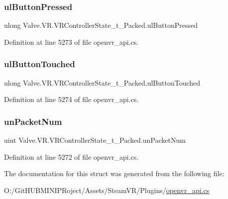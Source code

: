 \subsubsection{\texorpdfstring{ulButtonPressed}{ulButtonPressed}}
{\footnotesize\ttfamily ulong Valve.\+V\+R.\+V\+R\+Controller\+State\+\_\+t\+\_\+\+Packed.\+ul\+Button\+Pressed}



Definition at line 5273 of file openvr\+\_\+api.\+cs.

\mbox{\label{struct_valve_1_1_v_r_1_1_v_r_controller_state__t___packed_ad3ea022396546e8d29925c1aab78ead8}} 
\subsubsection{\texorpdfstring{ulButtonTouched}{ulButtonTouched}}
{\footnotesize\ttfamily ulong Valve.\+V\+R.\+V\+R\+Controller\+State\+\_\+t\+\_\+\+Packed.\+ul\+Button\+Touched}



Definition at line 5274 of file openvr\+\_\+api.\+cs.

\mbox{\label{struct_valve_1_1_v_r_1_1_v_r_controller_state__t___packed_a5a26fa7f4b5e10ba35c51f384773fbae}} 
\subsubsection{\texorpdfstring{unPacketNum}{unPacketNum}}
{\footnotesize\ttfamily uint Valve.\+V\+R.\+V\+R\+Controller\+State\+\_\+t\+\_\+\+Packed.\+un\+Packet\+Num}



Definition at line 5272 of file openvr\+\_\+api.\+cs.



The documentation for this struct was generated from the following file\+:\begin{DoxyCompactItemize}
\item 
O\+:/\+Git\+H\+U\+B\+M\+I\+N\+I\+P\+Roject/\+Assets/\+Steam\+V\+R/\+Plugins/\mbox{\hyperlink{openvr__api_8cs}{openvr\+\_\+api.\+cs}}\end{DoxyCompactItemize}
